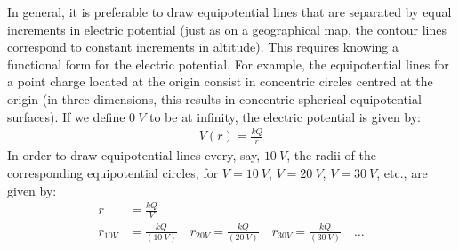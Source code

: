 
In general, it is preferable to draw equipotential lines that are separated by equal increments in electric potential (just as on a geographical map, the contour lines correspond to constant increments in altitude). This requires knowing a functional form for the electric potential. For example, the equipotential lines for a point charge located at the origin consist in concentric circles centred at the origin (in three dimensions, this results in concentric spherical equipotential surfaces). If we define $\SI{0}{V}$ to be at infinity, the electric potential is given by:
\begin{align*}
V(r)=\frac{kQ}{r}
\end{align*}
In order to draw equipotential lines every, say, $\SI{10}{V}$, the radii of the corresponding equipotential circles, for $V=\SI{10}{V}$, $V=\SI{20}{V}$, $V=\SI{30}{V}$, etc., are given by:
\begin{align*}
r&=\frac{kQ}{V}\\
r_{10V}&=\frac{kQ}{(\SI{10}{V})}\quad r_{20V}=\frac{kQ}{(\SI{20}{V})}\quad r_{30V}=\frac{kQ}{(\SI{30}{V})}\quad \dots
\end{align*}

